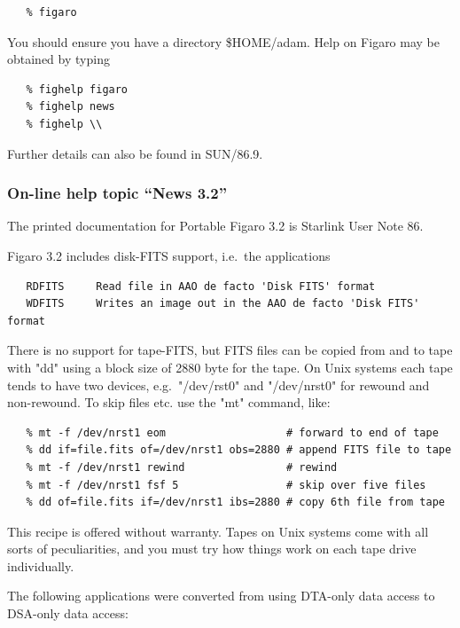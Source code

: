 \begin{verbatim}
   % figaro
\end{verbatim}

   You should ensure you have a directory \$HOME/adam.  Help on Figaro
   may be obtained by typing

\begin{verbatim}
   % fighelp figaro
   % fighelp news
   % fighelp \\
\end{verbatim}

   Further details can also be found in SUN/86.9.


\subsubsection{On-line help topic ``News 3.2''}

   The printed documentation for Portable Figaro 3.2 is Starlink User
   Note 86.

   Figaro 3.2 includes disk-FITS support, i.e.\ the applications

\begin{verbatim}
   RDFITS     Read file in AAO de facto 'Disk FITS' format
   WDFITS     Writes an image out in the AAO de facto 'Disk FITS' format
\end{verbatim}

   There is no support for tape-FITS, but FITS files can be copied from
   and to tape with "dd" using a block size of 2880 byte for the tape.
   On Unix systems each tape tends to have two devices, e.g.\ "/dev/rst0"
   and "/dev/nrst0" for rewound and non-rewound.  To skip files etc. use
   the "mt" command, like:

\begin{verbatim}
   % mt -f /dev/nrst1 eom                   # forward to end of tape
   % dd if=file.fits of=/dev/nrst1 obs=2880 # append FITS file to tape
   % mt -f /dev/nrst1 rewind                # rewind
   % mt -f /dev/nrst1 fsf 5                 # skip over five files
   % dd of=file.fits if=/dev/nrst1 ibs=2880 # copy 6th file from tape
\end{verbatim}

   This recipe is offered without warranty.  Tapes on Unix systems come
   with all sorts of peculiarities, and you must try how things work on
   each tape drive individually.

   The following applications were converted from using DTA-only data
   access to DSA-only data access:


